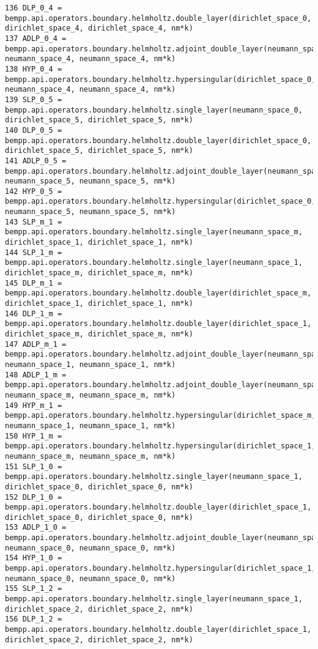 \documentclass[12pt,letterpaper]{article}
\numberwithin{equation}{section}
\begin{document}
\begin{lstlisting}
136 DLP_0_4 = bempp.api.operators.boundary.helmholtz.double_layer(dirichlet_space_0, dirichlet_space_4, dirichlet_space_4, nm*k)
137 ADLP_0_4 = bempp.api.operators.boundary.helmholtz.adjoint_double_layer(neumann_space_0, neumann_space_4, neumann_space_4, nm*k)
138 HYP_0_4 = bempp.api.operators.boundary.helmholtz.hypersingular(dirichlet_space_0, neumann_space_4, neumann_space_4, nm*k)
139 SLP_0_5 = bempp.api.operators.boundary.helmholtz.single_layer(neumann_space_0, dirichlet_space_5, dirichlet_space_5, nm*k)
140 DLP_0_5 = bempp.api.operators.boundary.helmholtz.double_layer(dirichlet_space_0, dirichlet_space_5, dirichlet_space_5, nm*k)
141 ADLP_0_5 = bempp.api.operators.boundary.helmholtz.adjoint_double_layer(neumann_space_0, neumann_space_5, neumann_space_5, nm*k)
142 HYP_0_5 = bempp.api.operators.boundary.helmholtz.hypersingular(dirichlet_space_0, neumann_space_5, neumann_space_5, nm*k)
143 SLP_m_1 = bempp.api.operators.boundary.helmholtz.single_layer(neumann_space_m, dirichlet_space_1, dirichlet_space_1, nm*k)
144 SLP_1_m = bempp.api.operators.boundary.helmholtz.single_layer(neumann_space_1, dirichlet_space_m, dirichlet_space_m, nm*k)
145 DLP_m_1 = bempp.api.operators.boundary.helmholtz.double_layer(dirichlet_space_m, dirichlet_space_1, dirichlet_space_1, nm*k)
146 DLP_1_m = bempp.api.operators.boundary.helmholtz.double_layer(dirichlet_space_1, dirichlet_space_m, dirichlet_space_m, nm*k)
147 ADLP_m_1 = bempp.api.operators.boundary.helmholtz.adjoint_double_layer(neumann_space_m, neumann_space_1, neumann_space_1, nm*k)
148 ADLP_1_m = bempp.api.operators.boundary.helmholtz.adjoint_double_layer(neumann_space_1, neumann_space_m, neumann_space_m, nm*k)
149 HYP_m_1 = bempp.api.operators.boundary.helmholtz.hypersingular(dirichlet_space_m, neumann_space_1, neumann_space_1, nm*k)
150 HYP_1_m = bempp.api.operators.boundary.helmholtz.hypersingular(dirichlet_space_1, neumann_space_m, neumann_space_m, nm*k)
151 SLP_1_0 = bempp.api.operators.boundary.helmholtz.single_layer(neumann_space_1, dirichlet_space_0, dirichlet_space_0, nm*k)
152 DLP_1_0 = bempp.api.operators.boundary.helmholtz.double_layer(dirichlet_space_1, dirichlet_space_0, dirichlet_space_0, nm*k)
153 ADLP_1_0 = bempp.api.operators.boundary.helmholtz.adjoint_double_layer(neumann_space_1, neumann_space_0, neumann_space_0, nm*k)
154 HYP_1_0 = bempp.api.operators.boundary.helmholtz.hypersingular(dirichlet_space_1, neumann_space_0, neumann_space_0, nm*k)
155 SLP_1_2 = bempp.api.operators.boundary.helmholtz.single_layer(neumann_space_1, dirichlet_space_2, dirichlet_space_2, nm*k)
156 DLP_1_2 = bempp.api.operators.boundary.helmholtz.double_layer(dirichlet_space_1, dirichlet_space_2, dirichlet_space_2, nm*k)

\end{lstlisting}
\end{document}
